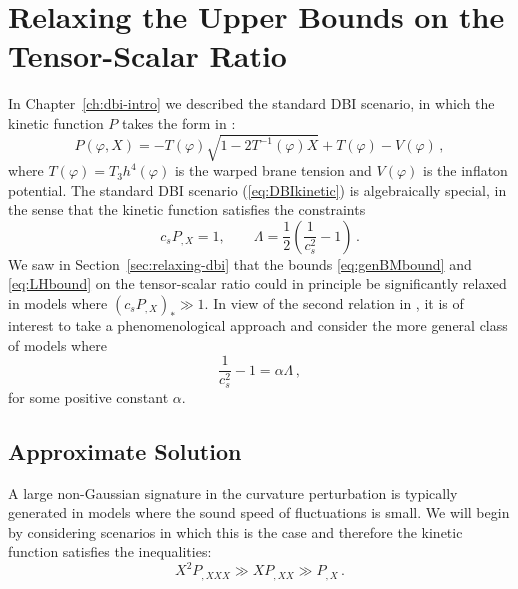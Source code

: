 \section{Relaxing the Upper Bounds on the Tensor-Scalar Ratio}
\label{sec:relaxing-multi}
% 
In Chapter~\ref{ch:dbi-intro} we described the standard DBI scenario, in
which the kinetic function $P$ takes the form in :
%  
\begin{equation}
\label{eq:DBIkinetic}
P (\varphi , X) = -T(\varphi ) \sqrt{1-2T^{-1}(\varphi ) X} + T(\varphi ) - V(\varphi ) \,,
\end{equation}
% 
where $T(\varphi ) = T_3 h^4 (\varphi )$ 
is the warped brane tension and  $V(\varphi )$ is the 
inflaton potential. The standard DBI scenario (\ref{eq:DBIkinetic}) is
algebraically special, 
in the sense that the kinetic function satisfies the constraints 
% 
\begin{equation}
\label{eq:cspx1}
c_s P_{,X} = 1 , \qquad  \Lambda = \frac{1}{2} \left( 
\frac{1}{c_s^2} -1 \right) \,.
\end{equation}
% 
We saw in Section~\ref{sec:relaxing-dbi} that the 
bounds \eqref{eq:genBMbound} and \eqref{eq:LHbound} 
on the tensor-scalar ratio could in principle be 
significantly relaxed in models where $(c_sP_{,X})_* \gg 1$. 
In view of the second relation in , it is of interest 
to take a phenomenological approach and consider the more  
general class of models where
%  
\begin{equation}
\label{eq:defalpha}
\frac{1}{c_s^2} -1 = \alpha \Lambda \,,
\end{equation}
% 
for some positive constant $\alpha$. 

\subsection{Approximate Solution}
\label{sec:approx-multi}
A large non-Gaussian signature in the curvature perturbation is 
typically generated in models where the sound speed of fluctuations 
is small. We will begin by considering 
scenarios in which this is the case and therefore the kinetic function satisfies
the inequalities: 
% 
\begin{equation}
\label{eq:Plimits}
X^2 P_{,XXX} \gg XP_{,XX} \gg P_{,X} \,.
\end{equation}
% 


